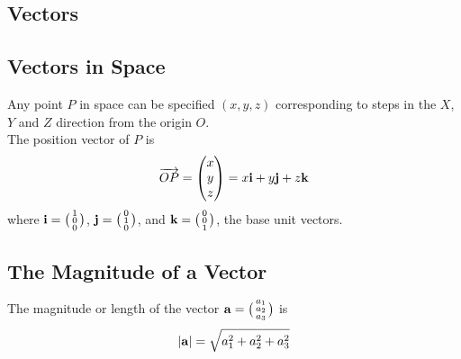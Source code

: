 \documentclass[10pt, a4paper, titlepage]{article}
\begin{document}
\begin{multicols*}{3}
\section{Vectors}
	\subsection{Vectors in Space}
	Any point $P$ in space can be specified $(x,y,z)$ corresponding to steps in the $X$, $Y$ and $Z$ direction from the origin $O$.\\
	The position vector of $P$ is
	\begin{align}
		\overrightarrow{OP}=\begin{pmatrix}x\\ y \\z\end{pmatrix}=x\vb{i}+y\vb{j}+z\vb{k}
	\end{align}
	where $\vb{i}=\big(\begin{smallmatrix}1 \\0 \\0 \end{smallmatrix}\big)$, 
	$\vb{j}=\big(\begin{smallmatrix}0 \\1 \\0 \end{smallmatrix}\big)$, and 
	$\vb{k}=\big(\begin{smallmatrix}0 \\0 \\1 \end{smallmatrix}\big)$, the base unit vectors.

	\dotfill
	\subsection{The Magnitude of a Vector}
	The magnitude or length of the vector $\vb{a}=\big(\begin{smallmatrix}a_1 \\a_2 \\a_3 \end{smallmatrix}\big)$ is
	\begin{align}
		|\vb{a}|=\sqrt{a_1^2+a_2^2+a_3^2}
	\end{align}
	
	\dotfill

\end{multicols*}
\end{document}
